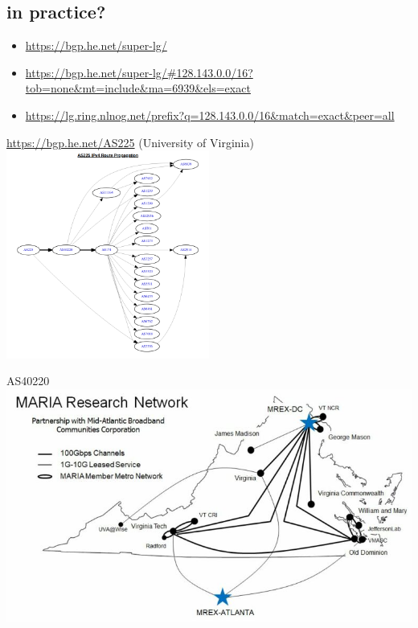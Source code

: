 
\subsection{in practice?}
\begin{frame}[fragile]{}
    \begin{itemize}
    \item \url{https://bgp.he.net/super-lg/}
    \item \url{https://bgp.he.net/super-lg/#128.143.0.0/16?tob=none&mt=include&ma=6939&els=exact}
    \item \url{https://lg.ring.nlnog.net/prefix?q=128.143.0.0/16&match=exact&peer=all}
    \end{itemize}
\end{frame}

\begin{frame}{}
\url{https://bgp.he.net/AS225} (University of Virginia) \\
\includegraphics[width=0.5\textwidth]{../routing/as225-graph}
\end{frame}

\begin{frame}{AS40220}
\includegraphics[height=0.8\textheight]{../routing/MARIA-Network-BW-768x441.jpg}
\end{frame}

